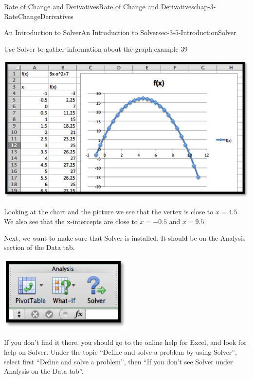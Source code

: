 \documentclass[oneside,10pt,]{book}
\numberwithin{equation}{section}
\begin{document}
\begin{chapterptx}{Rate of Change and Derivatives}{}{Rate of Change and Derivatives}{}{}{chap-3-RateChangeDerivatives}
\begin{sectionptx}{An Introduction to Solver}{}{An Introduction to Solver}{}{}{sec-3-5-IntroductionSolver}
\begin{example}{Use Solver to gather information about the graph.}{example-39}
\begin{sidebyside}{1}{0.15}{0.15}{0}%
\begin{sbspanel}{0.7}%
\includegraphics[width=1\linewidth]{images/sec3-5-1.png}
\end{sbspanel}%
\end{sidebyside}%
\par
\hypertarget{p-1330}{}%
Looking at the chart and the picture we see that the vertex is close to \(x=4.5\).  We also see that the x-intercepts are close to \(x=-0.5\) and \(x=9.5\).%
\par
\hypertarget{p-1331}{}%
Next, we want to make sure that Solver is installed.  It should be on the Analysis section of the Data tab.%
\begin{sidebyside}{1}{0.35}{0.35}{0}%
\begin{sbspanel}{0.3}%
\includegraphics[width=1\linewidth]{images/sec3-5-2.png}
\end{sbspanel}%
\end{sidebyside}%
\par
\hypertarget{p-1332}{}%
If you don’t find it there, you should go to the online help for Excel, and look for help on Solver.  Under the topic ``Define and solve a problem by using Solver'', select first ``Define and solve a problem'', then ``If you don’t see Solver under Analysis on the Data tab''.%

\end{example}
\end{sectionptx}
\end{chapterptx}
\end{document}
